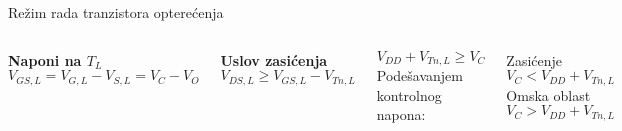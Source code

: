\begin{frame}[label=09_1-s037]{Režim rada tranzistora opterećenja}\setlength{\parskip}{2pt}\setlength{\abovedisplayskip}{4pt}\setlength{\belowdisplayskip}{4pt}\setlength{\abovedisplayshortskip}{3pt}\setlength{\belowdisplayshortskip}{3pt}
\begin{columns}[T,onlytextwidth]\centering {}\textbf{Naponi na $T_L$}\[V_{GS,L}=V_{G,L}-V_{S,L}=V_C-V_O\]

\textbf{Uslov zasićenja}\[V_{DS,L}\geq V_{GS,L}-V_{Tn,L}\]

\[V_{DD}+V_{Tn,L}\geq V_C\]
Podešavanjem kontrolnog napona:\begin{columns}[T,onlytextwidth]Zasićenje\[V_C<V_{DD}+V_{Tn,L}\]
Omska oblast\[V_C>V_{DD}+V_{Tn,L}\]
\end{columns}\end{columns}
\end{frame}

